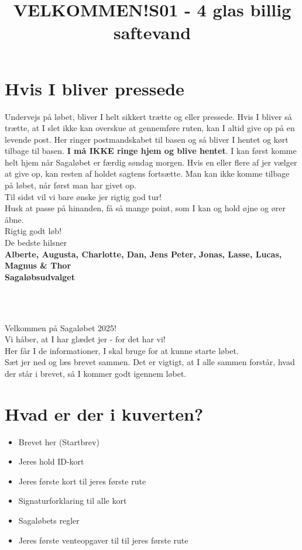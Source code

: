 \section{Hvis I bliver pressede}
Undervejs på løbet, bliver I helt sikkert trætte og eller pressede. Hvis I bliver så trætte, at I slet ikke kan overskue at gennemføre ruten, kan I altid give op på en levende post. Her ringer postmandskabet til basen og så bliver I hentet og kørt tilbage til basen. \textbf{I må IKKE ringe hjem og blive hentet}. I kan først komme helt hjem når Sagaløbet er færdig søndag morgen. Hvis en eller flere af jer vælger at give op, kan resten af holdet sagtens fortsætte. Man kan ikke komme tilbage på løbet, når først man har givet op.\\
\newline
Til sidst vil vi bare ønske jer rigtig god tur!\\
Husk at passe på hinanden, få så mange point, som I kan og hold øjne og ører åbne.\\
\newline
Rigtig godt løb!\\
\newline
\textcolor{søblå}{De bedste hilsner}\\
\textcolor{natblå}{\textbf{Alberte, Augusta, Charlotte, Dan, Jens Peter, Jonas, Lasse, Lucas, Magnus \& Thor}}\\
\textcolor{natblå}{\textbf{Sagaløbsudvalget}}\\
\newpage
\title{VELKOMMEN!}\\
\newline
\title{\textcolor{flammefarvet}{S01 - 4 glas billig saftevand }}\\
\newline
Velkommen på Sagaløbet 2025!\\
Vi håber, at I har glædet jer - for det har vi!\\
Her får I de informationer, I skal bruge for at kunne starte løbet.\\
Sæt jer ned og læs brevet sammen. Det er vigtigt, at I alle sammen forstår, hvad der står i brevet, så I kommer godt igennem løbet.
\section{Hvad er der i kuverten?}
\begin{itemize}
    \item Brevet her (Startbrev)
    \item Jeres hold ID-kort
    \item Jeres første kort til jeres første rute
    \item Signaturforklaring til alle kort
    \item Sagaløbets regler
    \item Jeres første venteopgaver til til jeres første rute
\end{itemize}
